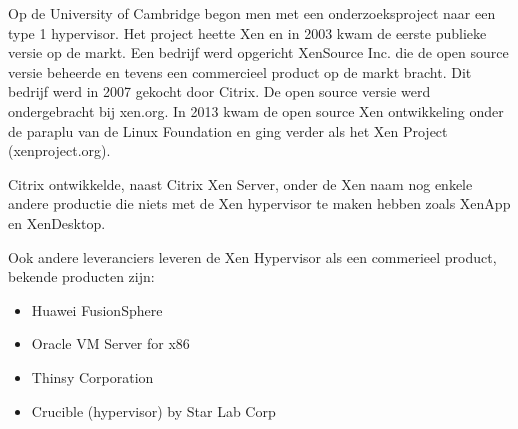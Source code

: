 Op de University of Cambridge begon men met een onderzoeksproject naar een type 1 hypervisor. Het project heette Xen en in 2003 kwam de eerste publieke versie op de markt. Een bedrijf werd opgericht XenSource Inc. die de open source versie beheerde en tevens een commercieel product op de markt bracht. Dit bedrijf werd in 2007 gekocht door Citrix. De open source versie werd ondergebracht bij xen.org. In 2013 kwam de open source Xen ontwikkeling onder de paraplu van de Linux Foundation en ging verder als het Xen Project (xenproject.org).

Citrix ontwikkelde, naast Citrix Xen Server, onder de Xen naam nog enkele andere productie die niets met de Xen hypervisor te maken hebben zoals XenApp en XenDesktop.

Ook andere leveranciers leveren de Xen Hypervisor als een commerieel product, bekende producten zijn:
\begin{itemize}
\item Huawei FusionSphere
\item Oracle VM Server for x86
\item Thinsy Corporation
\item Crucible (hypervisor) by Star Lab Corp
\end{itemize} 

